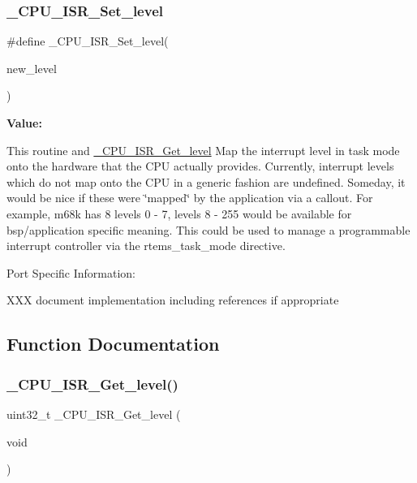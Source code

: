 \subsubsection{\texorpdfstring{\_CPU\_ISR\_Set\_level}{\_CPU\_ISR\_Set\_level}}
{\footnotesize\ttfamily \#define \+\_\+\+C\+P\+U\+\_\+\+I\+S\+R\+\_\+\+Set\+\_\+level(\begin{DoxyParamCaption}\item[{}]{new\+\_\+level }\end{DoxyParamCaption})}

{\bfseries Value\+:}
\begin{DoxyCode}{0}
\DoxyCodeLine{\{ \(\backslash\)}
\DoxyCodeLine{  \}}

\end{DoxyCode}
This routine and \mbox{\hyperlink{group__RTEMSScoreCPUARM_ga1d9dcab9170d532b6634a5620385adbd}{\+\_\+\+C\+P\+U\+\_\+\+I\+S\+R\+\_\+\+Get\+\_\+level}} Map the interrupt level in task mode onto the hardware that the C\+PU actually provides. Currently, interrupt levels which do not map onto the C\+PU in a generic fashion are undefined. Someday, it would be nice if these were \char`\"{}mapped\char`\"{} by the application via a callout. For example, m68k has 8 levels 0 -\/ 7, levels 8 -\/ 255 would be available for bsp/application specific meaning. This could be used to manage a programmable interrupt controller via the rtems\+\_\+task\+\_\+mode directive.

Port Specific Information\+:

X\+XX document implementation including references if appropriate 

\subsection{Function Documentation}
\mbox{\label{group__RTEMSScoreCPUlm32Interrupt_ga1d9dcab9170d532b6634a5620385adbd}} 
\subsubsection{\texorpdfstring{\_CPU\_ISR\_Get\_level()}{\_CPU\_ISR\_Get\_level()}}
{\footnotesize\ttfamily uint32\+\_\+t \+\_\+\+C\+P\+U\+\_\+\+I\+S\+R\+\_\+\+Get\+\_\+level (\begin{DoxyParamCaption}\item[{void}]{ }\end{DoxyParamCaption})}

